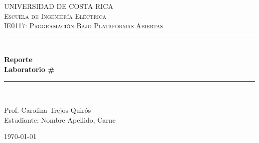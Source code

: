 \begin{titlepage}

\newcommand{\HRule}{\rule{\linewidth}{0.5mm}}

\center


\textsc{\LARGE UNIVERSIDAD DE COSTA RICA}\\[1.5cm]
\textsc{\Large Escuela de Ingeniería Eléctrica}\\[0.5cm]
\textsc{\large IE0117: Programación Bajo Plataformas Abiertas}\\[0.5cm]

\bigskip
\bigskip
\bigskip
\bigskip

\HRule \\[0.4cm]
{ \huge \bfseries Reporte\\[0.5cm] \LARGE Laboratorio \#}\\[0.4cm]
\HRule \\[1.5cm]


\begin{center} \large
Prof. Carolina Trejos Quirós\\
\bigskip
\bigskip
\bigskip
\bigskip
Estudiante: Nombre Apellido, Carne
\end{center}
\bigskip
\bigskip
\bigskip
\bigskip
\bigskip
\bigskip
\bigskip
\bigskip
\bigskip
\bigskip
\bigskip
\bigskip
\bigskip
\bigskip
\bigskip
\bigskip
\normalsize \today \vspace*{5\baselineskip}
\vfill %

\end{titlepage}
